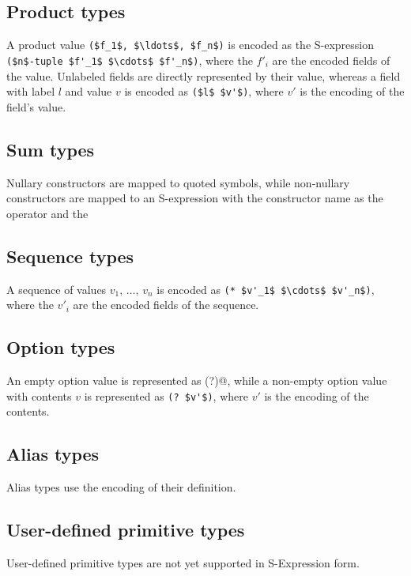 \subsection{Product types}
A product value \lstinline[mathescape=true]@($f_1$, $\ldots$, $f_n$)@
is encoded as the
S-expression \lstinline[mathescape=true]@($n$-tuple $f'_1$ $\cdots$ $f'_n$)@,
where the $f'_i$ are the encoded fields of the value.
Unlabeled fields are directly represented by their value, whereas a
field with label $l$ and value $v$ is encoded as
\lstinline[mathescape=true]@($l$ $v'$)@, where $v'$ is the encoding of the field's
value.

\subsection{Sum types}
Nullary constructors are mapped to quoted symbols, while non-nullary constructors are mapped
to an S-expression with the constructor name as the operator and the 

\subsection{Sequence types}
A sequence of values $v_1,\,\ldots,\,v_n$ is encoded as
\lstinline[mathescape=true]@(* $v'_1$ $\cdots$ $v'_n$)@,
where the $v'_i$ are the encoded fields of the sequence.

\subsection{Option types}
An empty option value is represented as \lstinline@(?)@, while a non-empty
option value with contents $v$ is represented as \lstinline[mathescape=true]@(? $v'$)@,
where $v'$ is the encoding of the contents.

\subsection{Alias types}
Alias types use the encoding of their definition.

\subsection{User-defined primitive types}
User-defined primitive types are not yet supported in S-Expression form.


